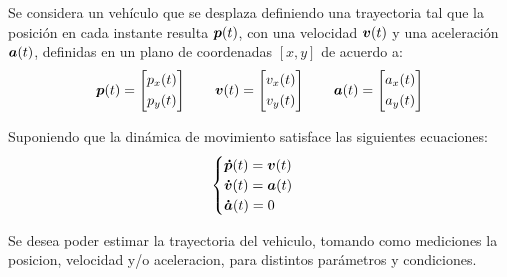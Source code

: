 
	Se considera un vehículo que se desplaza definiendo una trayectoria tal que la posición en cada instante resulta $\boldsymbol{p}(t)$, con una velocidad $\boldsymbol{v}(t)$ y una aceleración $\boldsymbol{a}(t)$, definidas en un plano de coordenadas $[x,y]$ de acuerdo a:
	\begin{equation*}
		\vect{p}(t) = \begin{bmatrix} p_x(t) \\[0.3em] p_y(t) \end{bmatrix} \qquad%
		\vect{v}(t) = \begin{bmatrix} v_x(t) \\[0.3em] v_y(t) \end{bmatrix} \qquad%
		\vect{a}(t) = \begin{bmatrix} a_x(t) \\[0.3em] a_y(t) \end{bmatrix}%
	\end{equation*}

	Suponiendo que la dinámica de movimiento satisface las siguientes ecuaciones:
	\begin{equation}
		\begin{cases}
			\boldsymbol{\dot{p}}(t) = \boldsymbol{v}(t)\\
			\boldsymbol{\dot{v}}(t) = \boldsymbol{a}(t)\\
			\boldsymbol{\dot{a}}(t) = 0
		\end{cases}
		\label{eq:dinamica_enun}
	\end{equation}

	Se desea poder estimar la trayectoria del vehiculo, tomando como mediciones la posicion, velocidad y/o aceleracion, para distintos parámetros y condiciones.
